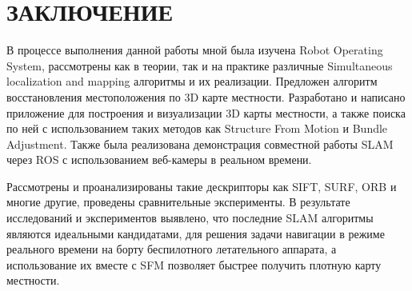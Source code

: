 \chapter*{ЗАКЛЮЧЕНИЕ}

В процессе выполнения данной работы мной была изучена Robot Operating System, рассмотрены как в теории, так и на практике различные Simultaneous localization and mapping алгоритмы и их реализации. Предложен алгоритм восстановления местоположения по 3D карте местности. Разработано и написано приложение для построения и визуализации 3D карты местности, а также поиска по ней с использованием таких методов как Structure From Motion и Bundle Adjustment. Также была реализована демонстрация совместной работы SLAM через ROS с использованием веб-камеры в реальном времени.

Рассмотрены и проанализированы такие дескрипторы как SIFT, SURF, ORB и многие другие, проведены сравнительные эксперименты. В результате исследований и экспериментов выявлено, что последние SLAM алгоритмы являются идеальными кандидатами, для решения задачи навигации в режиме реального времени на борту беспилотного летательного аппарата, а использование их вместе с SFM позволяет быстрее получить плотную карту местности.
\newpage
